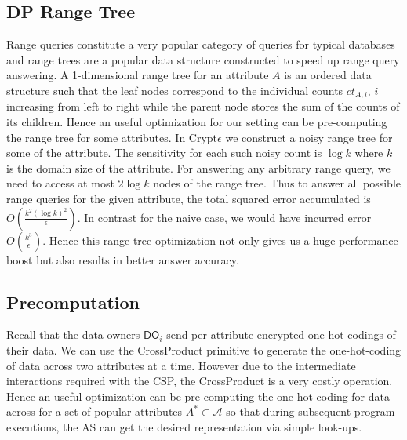 \subsection{DP Range Tree}
 Range queries constitute a very popular category of queries for typical databases and range trees are a popular data structure constructed to speed up range query answering. A 1-dimensional range tree for an attribute $A$ is an ordered data structure such that the leaf nodes correspond to the individual counts $ct_{A,i}$, $i$ increasing from left to right while the parent node stores the sum of the counts of its children. Hence an useful optimization for our setting can be pre-computing the range tree for some attributes. In Crypt$\epsilon$ we construct a noisy range tree for some of the attribute. The sensitivity for each such noisy count is $\log k$ where $k$ is the domain size of the attribute. For answering any arbitrary range query, we need to access at most $2\log k$ nodes of the range tree. Thus to answer all possible range queries for the given attribute, the total squared error accumulated is $O(\frac{k^2(\log k)^2 }{\epsilon})$. In contrast for the naive case, we would have incurred error $O(\frac{k^3}{\epsilon})$. Hence this range tree optimization not only gives us a huge performance boost but also results in better answer accuracy. \\


\subsection{Precomputation}  
Recall that the data owners $\textsf{DO}_i$ send per-attribute encrypted one-hot-codings of their data. We can use the \textsf{CrossProduct} primitive to generate the one-hot-coding of data across two attributes at a time. However due to the intermediate interactions required with the \textsf{CSP}, the \textsf{CrossProduct} is a very costly operation. Hence an  useful optimization can be pre-computing the one-hot-coding for data across for a set of popular attributes $A^* \subset \mathcal{A}$ so that during subsequent program executions, the \textsf{AS} can get the desired representation via simple look-ups. 
